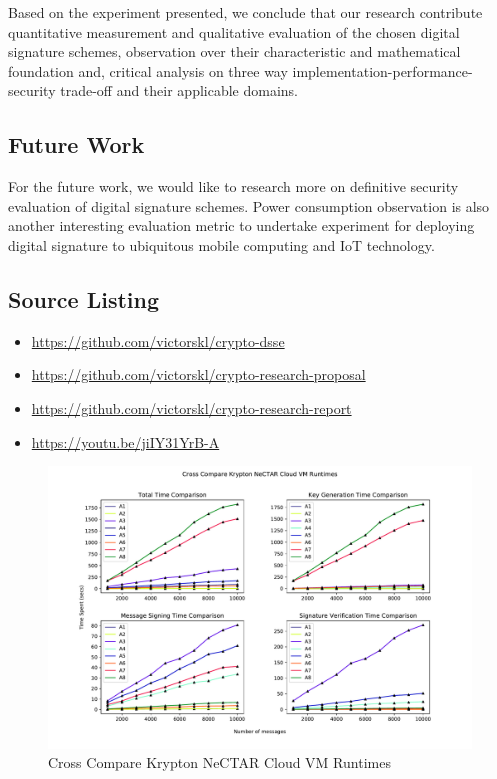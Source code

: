 \documentclass[10pt,sigconf]{acmart}
\begin{document}
Based on the experiment presented, we conclude that our research contribute quantitative measurement and qualitative evaluation of the chosen digital signature schemes, observation over their characteristic and mathematical foundation and, critical analysis on three way implementation-performance-security trade-off and their applicable domains.

\subsection{Future Work}

For the future work, we would like to research more on definitive security evaluation of digital signature schemes. Power consumption observation is also another interesting evaluation metric to undertake experiment for deploying digital signature to ubiquitous mobile computing and IoT technology.


\subsection{Source Listing}

\begin{itemize}
    \item \url{https://github.com/victorskl/crypto-dsse}
    \item \url{https://github.com/victorskl/crypto-research-proposal}
    \item \url{https://github.com/victorskl/crypto-research-report}
    \item \url{https://youtu.be/jiIY31YrB-A}
\end{itemize}


\onecolumn


% 
% 

\begin{figure}
\centering
\includegraphics[scale=0.6]{Cross_Compare_Krypton_Runtimes_Graph}
\caption{\small{Cross Compare Krypton NeCTAR Cloud VM Runtimes}}
\label{fig:Cross_Compare_Krypton_Runtimes_Graph}
\end{figure}
\end{document}
